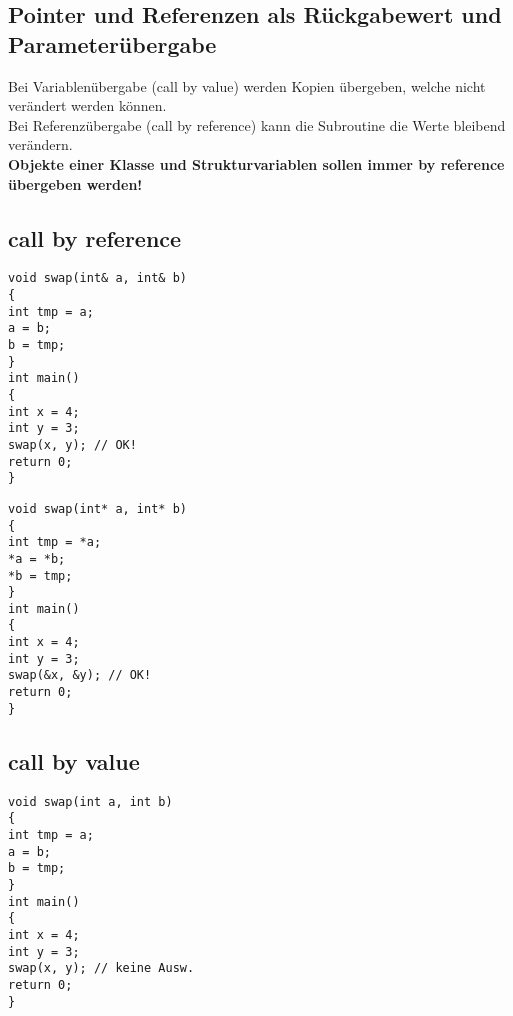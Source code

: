 \subsection{Pointer und Referenzen als Rückgabewert und Parameterübergabe}
  		Bei Variablenübergabe (call by value) werden Kopien übergeben, welche nicht verändert werden können.\\
  		Bei Referenzübergabe (call by reference) kann die Subroutine die Werte bleibend verändern. \\
  		\textbf{Objekte einer Klasse und Strukturvariablen sollen immer by reference übergeben werden!} \\
  		

\subsection{call by reference}
  \begin{minipage}[t]{5cm}
  \begin{lstlisting}
void swap(int& a, int& b)
{
int tmp = a;
a = b;
b = tmp;
}
int main()
{
int x = 4;
int y = 3;
swap(x, y); // OK!
return 0;
}	
\end{lstlisting}
\end{minipage}
\hspace*{0.5cm}
\begin{minipage}[t]{5cm}

\begin{lstlisting}
void swap(int* a, int* b)
{
int tmp = *a;
*a = *b;
*b = tmp;
}
int main()
{
int x = 4;
int y = 3;
swap(&x, &y); // OK!
return 0;
}
\end{lstlisting}
\end{minipage}
\begin{minipage}[t]{4.9 cm}
\subsection{call by value}
\begin{lstlisting}
void swap(int a, int b)
{
int tmp = a;
a = b;
b = tmp;
}
int main()
{
int x = 4;
int y = 3;
swap(x, y); // keine Ausw.
return 0;
}	
\end{lstlisting}
\end{minipage}


